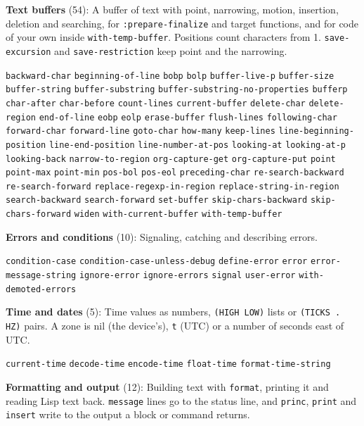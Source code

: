 \documentclass[11pt]{article}
\begin{document}
\textbf{Text buffers} (54): A buffer of text with point, narrowing, motion, insertion, deletion and searching, for \texttt{:prepare-finalize} and target functions, and for code of your own inside \texttt{with-temp-buffer}. Positions count characters from 1. \texttt{save-excursion} and \texttt{save-restriction} keep point and the narrowing.

\texttt{backward-char} \texttt{beginning-of-line} \texttt{bobp} \texttt{bolp} \texttt{buffer-live-p} \texttt{buffer-size} \texttt{buffer-string} \texttt{buffer-substring} \texttt{buffer-substring-no-properties} \texttt{bufferp} \texttt{char-after} \texttt{char-before} \texttt{count-lines} \texttt{current-buffer} \texttt{delete-char} \texttt{delete-region} \texttt{end-of-line} \texttt{eobp} \texttt{eolp} \texttt{erase-buffer} \texttt{flush-lines} \texttt{following-char} \texttt{forward-char} \texttt{forward-line} \texttt{goto-char} \texttt{how-many} \texttt{keep-lines} \texttt{line-beginning-position} \texttt{line-end-position} \texttt{line-number-at-pos} \texttt{looking-at} \texttt{looking-at-p} \texttt{looking-back} \texttt{narrow-to-region} \texttt{org-capture-get} \texttt{org-capture-put} \texttt{point} \texttt{point-max} \texttt{point-min} \texttt{pos-bol} \texttt{pos-eol} \texttt{preceding-char} \texttt{re-search-backward} \texttt{re-search-forward} \texttt{replace-regexp-in-region} \texttt{replace-string-in-region} \texttt{search-backward} \texttt{search-forward} \texttt{set-buffer} \texttt{skip-chars-backward} \texttt{skip-chars-forward} \texttt{widen} \texttt{with-current-buffer} \texttt{with-temp-buffer}

\textbf{Errors and conditions} (10): Signaling, catching and describing errors.

\texttt{condition-case} \texttt{condition-case-unless-debug} \texttt{define-error} \texttt{error} \texttt{error-message-string} \texttt{ignore-error} \texttt{ignore-errors} \texttt{signal} \texttt{user-error} \texttt{with-demoted-errors}

\textbf{Time and dates} (5): Time values as numbers, \texttt{(HIGH LOW)} lists or \texttt{(TICKS . HZ)} pairs. A zone is nil (the device's), \texttt{t} (UTC) or a number of seconds east of UTC.

\texttt{current-time} \texttt{decode-time} \texttt{encode-time} \texttt{float-time} \texttt{format-time-string}

\textbf{Formatting and output} (12): Building text with \texttt{format}, printing it and reading Lisp text back. \texttt{message} lines go to the status line, and \texttt{princ}, \texttt{print} and \texttt{insert} write to the output a block or command returns.
\end{document}
